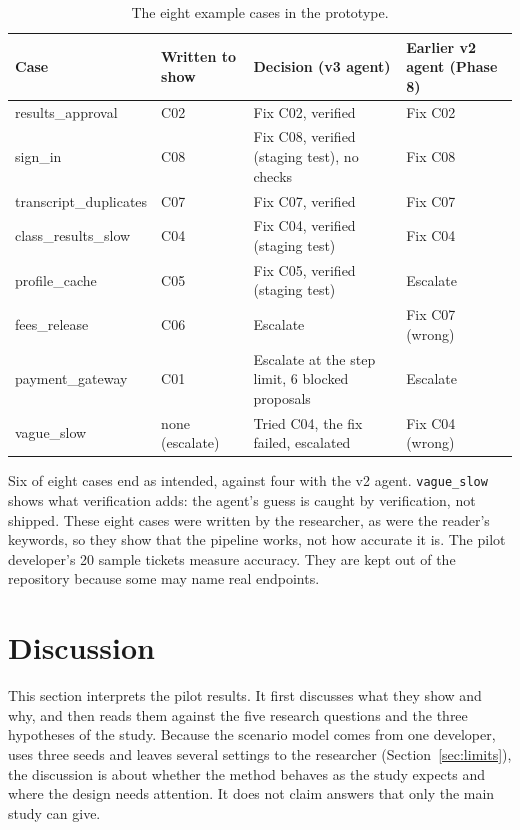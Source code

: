 \documentclass[11pt,a4paper]{article}
\begin{document}
\begin{table}[H]
\centering\small
\caption{The eight example cases in the prototype.}
\label{tab:prototype}
\begin{tabularx}{\linewidth}{@{}>{\ttfamily\small}l>{\raggedright\arraybackslash}p{1.9cm}L>{\raggedright\arraybackslash}p{3.4cm}@{}}
\toprule
\normalfont Case & Written to show & Decision (v3 agent) & Earlier v2 agent (Phase 8) \\
\midrule
results\_approval & C02 & Fix C02, verified & Fix C02 \\
sign\_in & C08 & Fix C08, verified (staging test), no checks & Fix C08 \\
transcript\_duplicates & C07 & Fix C07, verified & Fix C07 \\
class\_results\_slow & C04 & Fix C04, verified (staging test) & Fix C04 \\
profile\_cache & C05 & Fix C05, verified (staging test) & Escalate \\
fees\_release & C06 & Escalate & Fix C07 (wrong) \\
payment\_gateway & C01 & Escalate at the step limit, 6 blocked proposals & Escalate \\
vague\_slow & none (escalate) & Tried C04, the fix failed, escalated & Fix C04 (wrong) \\
\bottomrule
\end{tabularx}
\end{table}

Six of eight cases end as intended, against four with the v2 agent. \texttt{vague\_slow} shows what verification adds: the agent's guess is caught by verification, not shipped. These eight cases were written by the researcher, as were the reader's keywords, so they show that the pipeline works, not how accurate it is. The pilot developer's 20 sample tickets measure accuracy. They are kept out of the repository because some may name real endpoints.

\section{Discussion}\label{sec:discussion}

This section interprets the pilot results. It first discusses what they show and why, and then reads them against the five research questions and the three hypotheses of the study. Because the scenario model comes from one developer, uses three seeds and leaves several settings to the researcher (Section~\ref{sec:limits}), the discussion is about whether the method behaves as the study expects and where the design needs attention. It does not claim answers that only the main study can give.
\end{document}
